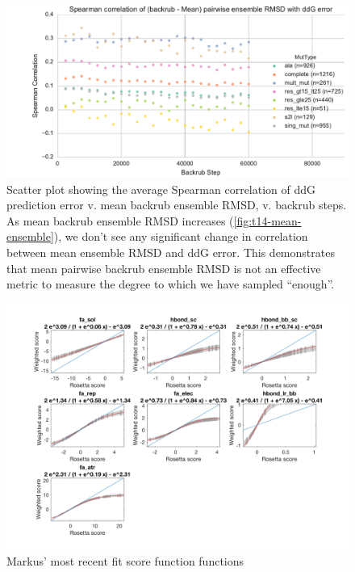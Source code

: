 \begin{figure}
  \includegraphics[width=\textwidth,keepaspectratio]{figures/t14-spear-corr.pdf}
  \caption{
    Scatter plot showing the average Spearman correlation of ddG prediction error v. mean backrub ensemble RMSD, v. backrub steps.
    As mean backrub ensemble RMSD increases (\cref{fig:t14-mean-ensemble}), we don't see any significant change in correlation between mean ensemble RMSD and ddG error.
    This demonstrates that mean pairwise backrub ensemble RMSD is not an effective metric to measure the degree to which we have sampled ``enough''.
  } \label{fig:spear-corr-rmsd-error}
\end{figure}

\begin{figure}
  \includegraphics[width=\textwidth,keepaspectratio]{figures/zemu-sigmoid2-tal-feats.png}
  \caption{
    Markus' most recent fit score function functions
  } \label{fig:t14-fits-feats}
\end{figure}

